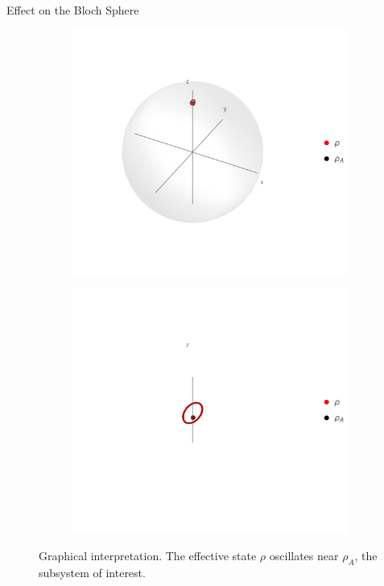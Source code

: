 \begin{frame}{Effect on the Bloch Sphere}
    \begin{figure}[h!]
        \centering
        \begin{subfigure}{0.44\textwidth}
            \centering
            \includegraphics[width=0.9\linewidth]{figures/U1xU2_H1=(sz)_H2=15(sx-sy)_z=0.8_p=0.9_far.png}
        \end{subfigure}%
        \begin{subfigure}{0.44\textwidth}
            \centering
            \includegraphics[width=0.9\linewidth]{figures/U1xU2_H1=(sz)_H2=15(sx-sy)_z=0.8_p=0.9.png}
        \end{subfigure}
        \caption{Graphical interpretation. The effective state $\rho$ oscillates near $\rho_{A}$, the subsystem of interest.}
    \end{figure}
\end{frame}

